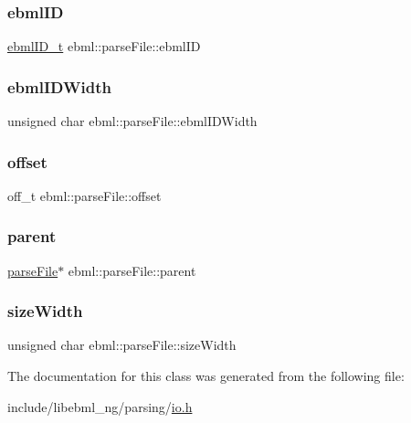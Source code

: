 \subsubsection{\texorpdfstring{ebml\+ID}{ebmlID}}
{\footnotesize\ttfamily \mbox{\hyperlink{namespaceebml_a86c5f604ddf12a74aa9812e997a58691}{ebml\+I\+D\+\_\+t}} ebml\+::parse\+File\+::ebml\+ID}

\mbox{\label{classebml_1_1parseFile_a0ff076fb9e1326d33c1d548b5d64f61d}} 
\subsubsection{\texorpdfstring{ebml\+I\+D\+Width}{ebmlIDWidth}}
{\footnotesize\ttfamily unsigned char ebml\+::parse\+File\+::ebml\+I\+D\+Width}

\mbox{\label{classebml_1_1parseFile_ab24f05f852f306ce6ea5b1be02cc8476}} 
\subsubsection{\texorpdfstring{offset}{offset}}
{\footnotesize\ttfamily off\+\_\+t ebml\+::parse\+File\+::offset}

\mbox{\label{classebml_1_1parseFile_a00df584c2edbd4ca1cd0a3e9082f9004}} 
\subsubsection{\texorpdfstring{parent}{parent}}
{\footnotesize\ttfamily \mbox{\hyperlink{classebml_1_1parseFile}{parse\+File}}$\ast$ ebml\+::parse\+File\+::parent}

\mbox{\label{classebml_1_1parseFile_ad13d3f7ac6cc6119754bda17260657fd}} 
\subsubsection{\texorpdfstring{size\+Width}{sizeWidth}}
{\footnotesize\ttfamily unsigned char ebml\+::parse\+File\+::size\+Width}



The documentation for this class was generated from the following file\+:\begin{DoxyCompactItemize}
\item 
include/libebml\+\_\+ng/parsing/\mbox{\hyperlink{parsing_2io_8h}{io.\+h}}\end{DoxyCompactItemize}
